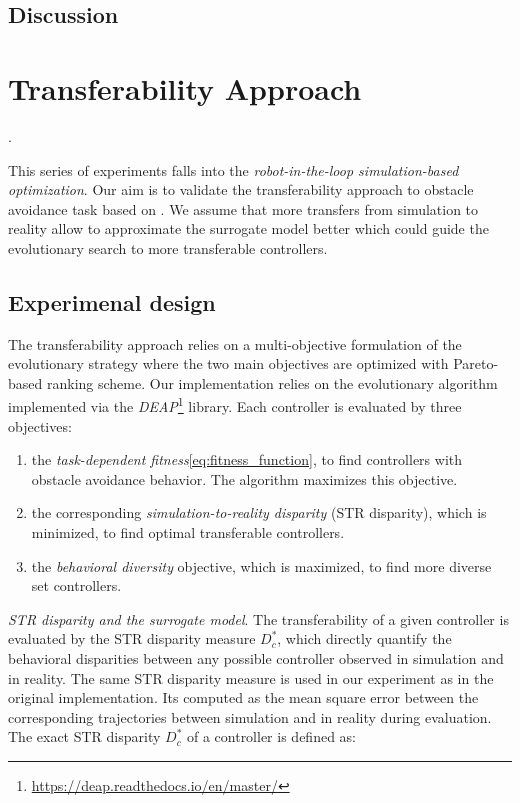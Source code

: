 \subsection{Discussion}

\section{Transferability Approach}.

This series of experiments falls into the \emph{robot-in-the-loop simulation-based optimization}. Our aim is to validate the transferability approach to obstacle avoidance task based on \citep{koos2012transferability}. We assume that more transfers from simulation to reality allow to approximate the surrogate model better which could guide the evolutionary search to more transferable controllers.

\subsection{Experimenal design}

The transferability approach relies on a multi-objective formulation of the evolutionary strategy where the two main objectives are optimized with Pareto-based ranking scheme. Our implementation relies on the \citep{deb200fast} evolutionary algorithm implemented via the \emph{DEAP}\footnote{\url{https://deap.readthedocs.io/en/master/}} library. Each controller is evaluated by three objectives:

\begin{enumerate}
	\item the \emph{task-dependent fitness}\ref{eq:fitness_function}, to find controllers with obstacle avoidance behavior. 	The algorithm maximizes this objective.
	\item the corresponding \emph{simulation-to-reality disparity} (STR disparity), which is minimized, to find optimal transferable controllers.
	\item the \emph{behavioral diversity} objective, which is maximized, to find more diverse set controllers.
\end{enumerate}

\emph{STR disparity and the surrogate model}. The transferability of a given controller is evaluated by the  STR disparity measure \(D^{*}_{{c}}\), which directly quantify the behavioral disparities between any possible controller observed in simulation and in reality. The same STR disparity measure is used in our experiment as in the original implementation. Its computed as the mean square error between the corresponding trajectories between simulation and in reality during evaluation. The exact STR disparity \(D^{*}_{{c}}\) of a controller is defined as:

